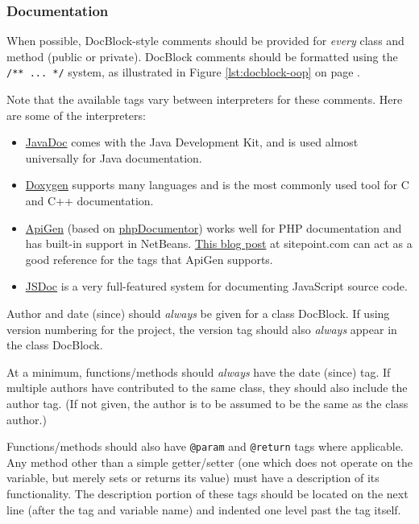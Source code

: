 \documentclass[12pt,letter]{memoir} %
\begin{document}
		\subsubsection{Documentation}
			When possible, DocBlock-style comments should be provided for
			\emph{every} class and method (public or private). DocBlock comments
			should be formatted using the \texttt{/** ... */} system, as
			illustrated in Figure \ref{lst:docblock-oop} on page
			\pageref{lst:docblock-oop}.
			
			Note that the available tags vary between
			interpreters for these comments. Here are some of the interpreters:
			\begin{itemize}
				\item \href{http://www.oracle.com/technetwork/java/javase/documentation/index-jsp-135444.html}{JavaDoc} 
					comes with the Java Development Kit, and is used almost
					universally for Java documentation.
				\item \href{http://www.stack.nl/~dimitri/doxygen/}{Doxygen}
					supports many languages and is the most commonly used tool
					for C and C++ documentation.
				\item \href{http://apigen.org/}{ApiGen} (based on
					\href{http://www.phpdoc.org/}{phpDocumentor}) works well for
					PHP documentation and has built-in support in NetBeans.
					\href{http://www.sitepoint.com/generate-documentation-with-apigen/}{This blog post}
					at sitepoint.com can act as a good reference for the tags
					that ApiGen supports.
				\item \href{http://usejsdoc.org}{JSDoc} is a very full-featured
					system for documenting JavaScript source code.
			\end{itemize}
			
			Author and date (since) should \emph{always} be given for a class
			DocBlock. If using version numbering for the project, the version
			tag should also \emph{always} appear in the class DocBlock.
			
			At a minimum, functions/methods should \emph{always} have the date
			(since) tag. If multiple authors have contributed to the same class,
			they should also include the author tag. (If not given, the author
			is to be assumed to be the same as the class author.)
			
			Functions/methods should also have \texttt{@param} and
			\texttt{@return} tags where applicable. Any method other than a
			simple getter/setter (one which does not operate on the variable,
			but merely sets or returns its value) must have a description of its
			functionality. The description portion of these tags should be
			located on the next line (after the tag and variable name) and
			indented one level past the tag itself.
			
\end{document}
